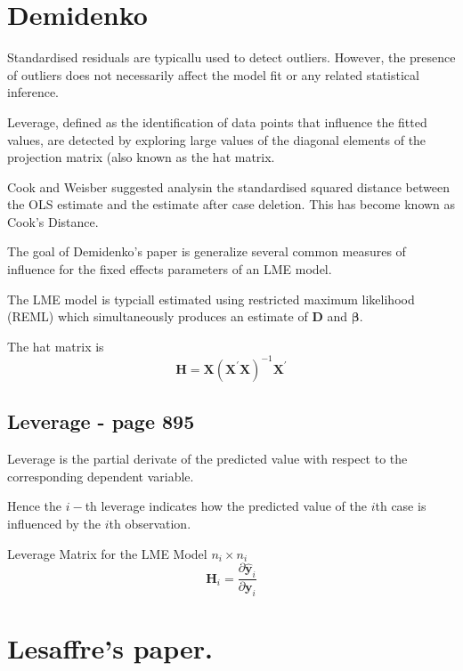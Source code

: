 \documentclass[MAIN.tex]{subfiles}
\begin{document}
\section{ Demidenko}

Standardised residuals are typicallu used to detect outliers. However, the presence of outliers does not necessarily affect the model fit or any related statistical inference.

Leverage, defined as the identification of data points that influence the fitted values, are detected by exploring large values of the diagonal elements of the projection matrix (also known as the hat matrix.

Cook and Weisber suggested analysin the standardised squared distance between the OLS estimate and the estimate after case deletion. This has become known as Cook's Distance.

The goal of Demidenko's paper is generalize several common measures of influence for the fixed effects parameters of an LME model.



The LME model is typciall estimated using restricted maximum likelihood (REML) which simultaneously produces an estimate of $\boldsymbol{D}$ and $\boldsymbol{\beta}$.

The hat matrix is 
\[\boldsymbol{H}  =  \boldsymbol{X} (\boldsymbol{X}^{\prime}\boldsymbol{X})^{-1}\boldsymbol{X} ^{\prime} \]

\subsection*{Leverage - page 895}
Leverage is the partial derivate of  the predicted value with respect to the corresponding dependent variable.

Hence the $i-$th leverage indicates how the predicted value of the $i$th case is influenced by the $i$th observation.


Leverage Matrix  for the LME Model $n_i \times n_i$
\[ \boldsymbol{H}_i = \frac{ \partial \hat{\boldsymbol{y}}_i } {\partial \boldsymbol{y}_i } \]

\section{Lesaffre's paper.} %
\end{document}
